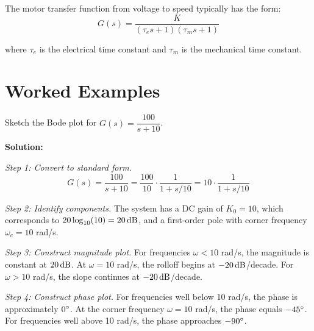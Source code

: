 The motor transfer function from voltage to speed typically has the form:
\begin{equation}
G(s) = \frac{K}{(\tau_e s + 1)(\tau_m s + 1)}
\end{equation}

where $\tau_e$ is the electrical time constant and $\tau_m$ is the mechanical time constant.

\section{Worked Examples}
\label{sec:examples}

\begin{example}
\label{ex:first_order}
Sketch the Bode plot for $G(s) = \dfrac{100}{s + 10}$.

\textbf{Solution:}

\textit{Step 1: Convert to standard form.}
\begin{equation}
G(s) = \frac{100}{s + 10} = \frac{100}{10} \cdot \frac{1}{1 + s/10} = 10 \cdot \frac{1}{1 + s/10}
\end{equation}

\textit{Step 2: Identify components.}
The system has a DC gain of $K_0 = 10$, which corresponds to $20\log_{10}(10) = 20\,\text{dB}$, and a first-order pole with corner frequency $\omega_c = 10$ rad/s.

\textit{Step 3: Construct magnitude plot.}
For frequencies $\omega < 10$ rad/s, the magnitude is constant at $20\,\text{dB}$. At $\omega = 10$ rad/s, the rolloff begins at $-20\,\text{dB}$/decade. For $\omega > 10$ rad/s, the slope continues at $-20\,\text{dB}$/decade.

\textit{Step 4: Construct phase plot.}
For frequencies well below 10 rad/s, the phase is approximately $0^\circ$. At the corner frequency $\omega = 10$ rad/s, the phase equals $-45^\circ$. For frequencies well above 10 rad/s, the phase approaches $-90^\circ$.

\begin{center}


\end{center}
\end{example}
